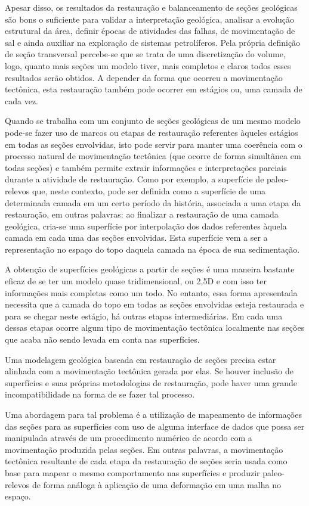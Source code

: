 Apesar disso, os resultados da restauração e balanceamento de seções geológicas são bons o suficiente para validar a interpretação geológica, analisar a evolução estrutural da área, definir épocas de atividades das falhas, de movimentação de sal e ainda auxiliar na exploração de sistemas petrolíferos.\cite{Guedes} Pela própria definição de seção transversal percebe-se que se trata de uma discretização do volume, logo, quanto mais seções um modelo tiver, mais completos e claros todos esses resultados serão obtidos. A depender da forma que ocorreu a movimentação tectônica, esta restauração também pode ocorrer em estágios ou, uma camada de cada vez.

Quando se trabalha com um conjunto de seções geológicas de um mesmo modelo pode-se fazer uso de marcos ou etapas de restauração referentes àqueles estágios em todas as seções envolvidas, isto pode servir para manter uma coerência com o processo natural de movimentação tectônica (que ocorre de forma simultânea em todas seções) e também permite extrair informações e interpretações parciais durante a atividade de restauração. Como por exemplo, a superfície de paleo-relevos que, neste contexto, pode ser definida como a superfície de uma determinada camada em um certo período da história, associada a uma etapa da restauração, em outras palavras: ao finalizar a restauração de uma camada geológica, cria-se uma superfície por interpolação dos dados referentes àquela camada em cada uma das seções envolvidas. Esta superfície vem a ser a representação no espaço do topo daquela camada na época de sua sedimentação.

A obtenção de superfícies geológicas a partir de seções é uma maneira bastante eficaz de se ter um modelo quase tridimensional, ou 2,5D e com isso ter informações mais completas como um todo. No entanto, essa forma apresentada necessita que a camada do topo em todas as seções envolvidas esteja restaurada e para se chegar neste estágio, há outras etapas intermediárias. Em cada uma dessas etapas ocorre algum tipo de movimentação tectônica localmente nas seções que acaba não sendo levada em conta nas superfícies.

Uma modelagem geológica baseada em restauração de seções precisa estar alinhada com a movimentação tectônica gerada por elas. Se houver inclusão de superfícies e suas próprias metodologias de restauração, pode haver uma grande incompatibilidade na forma de se fazer tal processo.

Uma abordagem para tal problema é a utilização de mapeamento de informações das seções para as superfícies com uso de alguma interface de dados que possa ser manipulada através de um procedimento numérico de acordo com a movimentação produzida pelas seções. Em outras palavras, a movimentação tectônica resultante de cada etapa da restauração de seções seria usada como base para mapear o mesmo comportamento nas superfícies e produzir paleo-relevos de forma análoga à aplicação de uma deformação em uma malha no espaço.

